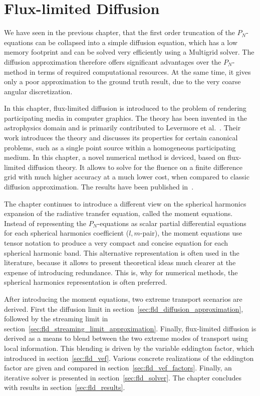 \chapter{Flux-limited Diffusion}
\label{sec:fld}

We have seen in the previous chapter, that the first order truncation of the $P_N$-equations can be collapsed into a simple diffusion equation, which has a low memory footprint and can be solved very efficiently using a Multigrid solver. The diffusion approximation therefore offers significant advantages over the $P_N$-method in terms of required computational resources. At the same time, it gives only a poor approximation to the ground truth result, due to the very coarse angular discretization.

In this chapter, flux-limited diffusion is introduced to the problem of rendering participating media in computer graphics. The theory has been invented in the astrophysics domain and is primarily contributed to Levermore et al.~\cite{Levermore81}. Their work introduces the theory and discusses its properties for certain canonical problems, such as a single point source within a homogeneous participating medium. In this chapter, a novel numerical method is deviced, based on flux-limited diffusion theory. It allows to solve for the fluence on a finite difference grid with much higher accuracy at a much lower cost, when compared to classic diffusion approximation. The results have been published in~\cite{Koerner14}.

The chapter continues to introduce a different view on the spherical harmonics expansion of the radiative transfer equation, called the moment equations. Instead of representing the $P_N$-equations as scalar partial differential equations for each spherical harmonics coefficient ($l,m$-pair), the moment equations use tensor notation to produce a very compact and concise equation for each spherical harmonic band. This alternative representation is often used in the literature, because it allows to present theoretical ideas much clearer at the expense of introducing redundance. This is, why for numerical methods, the spherical harmonics representation is often preferred.

After introducing the moment equations, two extreme transport scenarios are derived. First the diffusion limit in section~\ref{sec:fld_diffusion_approximation}, followed by the streaming limit in section~\ref{sec:fld_streaming_limit_approximation}. Finally, flux-limited diffusion is derived as a means to blend between the two extreme modes of transport using local information. This blending is driven by the variable eddington factor, which introduced in section~\ref{sec:fld_vef}. Various concrete realizations of the eddington factor are given and compared in section~\ref{sec:fld_vef_factors}. Finally, an iterative solver is presented in section~\ref{sec:fld_solver}. The chapter concludes with results in section~\ref{sec:fld_results}.




